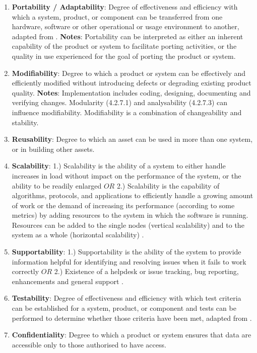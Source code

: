 \begin{enumerate}
    \item \textbf{Portability / Adaptability}: Degree of effectiveness and efficiency with which a system, product, or component can be transferred from one hardware, software or other operational or usage environment to another, adapted from \cite{iso_central_secretary_isoiecieee_2010}. \textbf{Notes}: Portability can be interpreted as either an inherent capability of the product or system to facilitate porting activities, or the quality in use experienced for the goal of porting the product or system.

    \item \textbf{Modifiability}: Degree to which a product or system can be effectively and efficiently modified without introducing defects or degrading existing product quality. \textbf{Notes}: Implementation includes coding, designing, documenting and verifying changes. Modularity (4.2.7.1) and analysability (4.2.7.3) can influence modifiability. Modifiability is a combination of changeability and stability.

    \item \textbf{Reusability}: Degree to which an asset can be used in more than one system, or in building other assets.

    \item \textbf{Scalability}: 1.) Scalability is the ability of a system to either handle increases in load without impact on the performance of the system, or the ability to be readily enlarged \cite{microsoft_2010} $OR$ 2.) Scalability is the capability of algorithms, protocols, and applications to efficiently handle a growing amount of work or the demand of increasing its performance (according to some metrics) by adding resources to the system in which the software is running. Resources can be added to the single nodes (vertical scalability) and to the system as a whole (horizontal scalability) \cite{bondi_2000}.

    \item \textbf{Supportability}: 1.) Supportability is the ability of the system to provide information helpful for identifying and resolving issues when it fails to work correctly \cite{microsoft_2010} $OR$ 2.) Existence of a helpdesk or issue tracking, bug reporting, enhancements and general support \cite{orviz_fernandez_eosc-synergy_2020}.

    \item \textbf{Testability}: Degree of effectiveness and efficiency with which test criteria can be established for a system, product, or component and tests can be performed to determine whether those criteria have been met, adapted from \cite{iso_central_secretary_isoiecieee_2010}.

    \item \textbf{Confidentiality}: Degree to which a product or system ensures that data are accessible only to those authorised to have access.
\end{enumerate}


